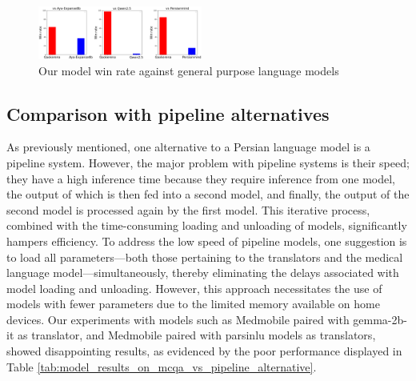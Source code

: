 \documentclass[conference]{IEEEtran}
\begin{document}
\begin{figure}[htbp]
	\centerline{\includegraphics[width=0.48\textwidth]{fig4.png}}
	\caption{Our model win rate against general purpose language models}
	\label{fig4}
\end{figure}
\subsection{Comparison with pipeline alternatives}
As previously mentioned, one alternative to a Persian language model is a pipeline system. However, the major problem with pipeline systems is their speed; they have a high inference time because they require inference from one model, the output of which is then fed into a second model, and finally, the output of the second model is processed again by the first model. This iterative process, combined with the time-consuming loading and unloading of models, significantly hampers efficiency. To address the low speed of pipeline models, one suggestion is to load all parameters—both those pertaining to the translators and the medical language model—simultaneously, thereby eliminating the delays associated with model loading and unloading. However, this approach necessitates the use of models with fewer parameters due to the limited memory available on home devices. Our experiments with models such as Medmobile 
\cite{b9}
paired with 
gemma-2b-it 
\cite{b14}
as translator, and Medmobile paired with parsinlu 
\cite{b30}
\cite{b31}
models as translators, showed disappointing results, as evidenced by the poor performance displayed in Table \ref{tab:model_results_on_mcqa_vs_pipeline_alternative}.
\end{document}
